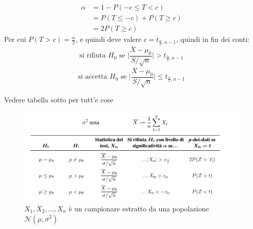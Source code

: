 \documentclass[]{article}
\begin{document}
    \begin{equation*}
        \begin{split}
            \alpha &= 1 - P(-c \leq T < c) \\
            &= P(T \leq -c) + P(T \geq c) \\
            &= 2P(T \geq c)
        \end{split}
    \end{equation*}
    Per cui $P(T > c) = \frac{\alpha}{2}$, e quindi deve valere $c = t_{\frac{\alpha}{2}, n-1}$, quindi in fin dei conti:
    \[ \text{si rifiuta } H_0 \text{ se } \big| \frac{\overline{X} - \mu_0}{S / \sqrt{n}} \big| > t_{\frac{\alpha}{2}, n-1} \]
    \[ \text{si accetta } H_0 \text{ se } \big| \frac{\overline{X} - \mu_0}{S / \sqrt{n}} \big| \leq t_{\frac{\alpha}{2}, n-1} \]
    \centerline{Vedere tabella sotto per tutt'e cose}
    \begin{figure}[H]
        \caption{$X_1, X_2, \ldots, X_n$ è un campionare estratto da una popolazione $\mathcal{N}(\mu, \sigma^2)$}
        \includegraphics[width=\textwidth]{images/boh_7.png}
    \end{figure}
\end{document}
